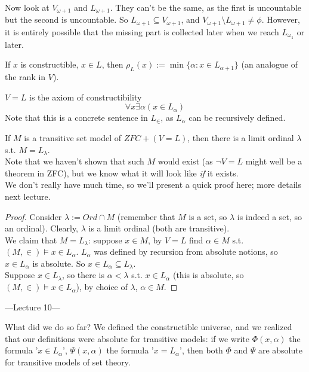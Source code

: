 \documentclass[a4paper]{article}
\begin{document}
Now look at $V_{\omega+1}$ and $L_{\omega+1}$. They can't be the same, as the first is uncountable but the second is uncountable. So $L_{\omega+1} \subseteq V_{\omega+1}$, and $V_{\omega+1} \setminus L_{\omega+1} \neq \phi$. However, it is entirely possible that the missing part is collected later when we reach $L_{\omega_1}$ or later.

\begin{defi}
If $x$ is constructible, $x \in L$, then $\rho_L(x) := \min\{\alpha: x \in L_{\alpha+1}\}$ (an analogue of the rank in $V$).
\end{defi}

\begin{defi}
$V=L$ is the axiom of constructibility
\[
\forall x \exists \alpha (x \in L_\alpha)
\]
Note that this is a concrete sentence in $L_\in$, as $L_\alpha$ can be recursively defined.
\end{defi}

\begin{lemma}
If $M$ is a transitive set model of $ZFC+(V=L)$, then there is a limit ordinal $\lambda$ s.t. $M=L_\lambda$.\\
Note that we haven't shown that such $M$ would exist (as $\neg V=L$ might well be a theorem in ZFC), but we know what it will look like \emph{if} it exists.\\
We don't really have much time, so we'll present a quick proof here; more details next lecture.
\begin{proof}
Consider $\lambda:= Ord \cap M$ (remember that $M$ is a set, so $\lambda$ is indeed a set, so an ordinal). Clearly, $\lambda$ is a limit ordinal (both are transitive).\\
We claim that $M=L_\lambda$: suppose $x \in M$, by $V=L$ find $\alpha \in M$ s.t. $(M,\in) \vDash x \in L_\alpha$. $L_\alpha$ was defined by recursion from absolute notions, so $x \in L_\alpha$ is absolute. So $x \in L_\alpha \subseteq L_\lambda$.\\
Suppose $x \in L_\lambda$, so there is $\alpha < \lambda$ s.t. $x \in L_\alpha$ (this is absolute, so $(M,\in) \vDash x \in L_\alpha$), by choice of $\lambda$, $\alpha \in M$.
\end{proof}
\end{lemma}

---Lecture 10---

What did we do so far? We defined the constructible universe, and we realized that our definitions were absolute for transitive models: if we write $\Phi(x,\alpha)$ the formula '$x \in L_\alpha$', $\Psi(x,\alpha)$ the formula '$x=L_\alpha$', then both $\Phi$ and $\Psi$ are absolute for transitive models of set theory.
\end{document}
